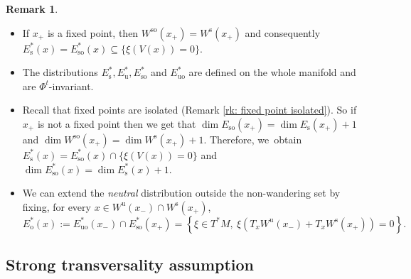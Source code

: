 \documentclass[JEP,XML,SOM,Unicode,NoEqCountersInSection,NoFloatCountersInSection,published]{cedram}
\newcommand{\ro}{\mathrm{o}}
\newcommand{\rs}{\mathrm{s}}
\newcommand{\rso}{\mathrm{so}}
\newcommand{\ru}{\mathrm{u}}
\newcommand{\ruo}{\mathrm{uo}}
\theoremstyle{definition}
\newtheorem{remark}[definition]{Remark}
\theoremstyle{plain}
\begin{document}
\pagebreak[2]
\skpt
\begin{remark}
\begin{itemize}
\item If $x_+$ is a fixed point, then $W^{\rso} (x_+) = W^{\rs} (x_+)$ and consequently $E_\rs^*(x) = E_{\rso}^*(x) \subseteq \{\xi (V(x)) = 0 \}$.
\item The distributions $E_\rs^*, E_\ru^*, E_{\rso}^*$ and $E_{\ruo}^*$ are defined on the whole manifold and are $\Phi^t$-invariant.
\item Recall that fixed points are isolated (Remark \ref{rk: fixed point isolated}). So if $x_+$ is not a fixed point then we get that $\dim E_{\rso}(x_+) = \dim E_{\rs}(x_+) + 1$ and $\dim W^{\rso} (x_+) = \dim W^{\rs} (x_+) + 1$. Therefore, we~obtain $E_{\rs}^* (x) = E_{\rso}^* (x) \cap \{\xi (V(x)) = 0 \}$ and $\dim E_{\rso}^* (x) = \dim E_{\rs}^* (x) + 1$.
\item We can extend the \textit{neutral} distribution outside the non-wandering set by fixing, for every $x \in W^\ru (x_-) \cap W^\rs (x_+)$,
\[
E_\ro^* (x):= E_{\ruo}^* (x_-) \cap E_{\rso}^* (x_+) = \left\{ \xi \in T^* M, \: \xi \left(T_x W^{\ru} (x_-) + T_x W^{\rs} (x_+)\right) = 0 \right\}.
\]
\end{itemize}
\end{remark}

\subsection{Strong transversality assumption}
\end{document}
